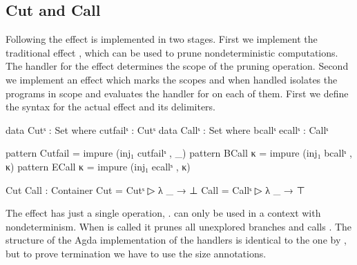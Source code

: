 \subsection{Cut and Call}

Following \textcite{DBLP:conf/haskell/WuSH14} the effect is implemented in two
stages.
First we implement the traditional effect , which can be used
to prune nondeterministic computations.
The handler for the effect determines the scope of the pruning operation.
Second we implement an effect which marks the scopes and when handled isolates
the programs in scope and evaluates the handler for  on each
of them.
First we define the syntax for the actual effect and its delimiters.

\begin{code}
data Cutˢ   : Set where cutfailˢ : Cutˢ
data Callˢ  : Set where bcallˢ ecallˢ : Callˢ

pattern Cutfail   = impure (inj₁ cutfailˢ , _)
pattern BCall  κ  = impure (inj₁ bcallˢ , κ)
pattern ECall  κ  = impure (inj₁ ecallˢ , κ)

Cut Call : Container
Cut   = Cutˢ    ▷ λ _ → ⊥
Call  = Callˢ   ▷ λ _ → ⊤
\end{code}
The  effect has just a single operation, .
 can only be used in a context with nondeterminism.
When  is called it prunes all unexplored branches and
calls .
The structure of the Agda implementation of the handlers is identical to the one
by \textcite{DBLP:conf/haskell/WuSH14}, but to prove termination we have to use
the size annotations.

